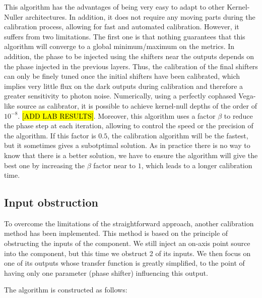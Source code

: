 \documentclass{aa}
\begin{document}
            This algorithm has the advantages of being very easy to adapt to other Kernel-Nuller architectures. In addition, it does not require any moving parts during the calibration process, allowing for fast and automated calibration. However, it suffers from two limitations. The first one is that nothing guarantees that this algorithm will converge to a global minimum/maximum on the metrics. In addition, the phase to be injected using the shifters near the outputs depends on the phase injected in the previous layers. Thus, the calibration of the final shifters can only be finely tuned once the initial shifters have been calibrated, which implies very little flux on the dark outputs during calibration and therefore a greater sensitivity to photon noise. Numerically, using a perfectly cophased Vega-like source as calibrator, it is possible to achieve kernel-null depths of the order of $10^{-8}$. \hl{[ADD LAB RESULTS]}. Moreover, this algorithm uses a factor $\beta$ to reduce the phase step at each iteration, allowing to control the speed or the precision of the algorithm. If this factor is $0.5$, the calibration algorithm will be the fastest, but it sometimes gives a subotptimal solution. As in practice there is no way to know that there is a better solution, we have to ensure the algorithm will give the best one by increasing the $\beta$ factor near to $1$, which leads to a longer calibration time.
    
        \subsection{Input obstruction}
            To overcome the limitations of the straightforward approach, another calibration method has been implemented. This method is based on the principle of obstructing the inputs of the component. We still inject an on-axis point source into the component, but this time we obstruct 2 of its inputs. We then focus on one of its outputs whose transfer function is greatly simplified, to the point of having only one parameter (phase shifter) influencing this output.
    
            The algorithm is constructed as follows:
    
\end{document}
